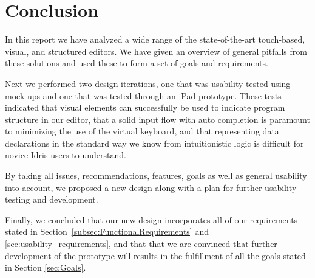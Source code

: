 \chapter{Conclusion}
\label{sec:Conclusion}

In this report we have analyzed a wide range of the state-of-the-art touch-based, visual, and structured
editors. We have given an overview of general pitfalls from these solutions and used these to form a set of goals and requirements. 

Next we performed two design iterations, one that was usability tested using
mock-ups and one that was tested through an iPad prototype. These tests
indicated that visual elements can successfully be used to indicate program structure in our editor, that
a solid input flow with auto completion is paramount to minimizing the use of
the virtual keyboard, and that representing data declarations in the standard
way we know from intuitionistic logic is difficult for novice Idris users to
understand.

By taking all issues, recommendations, features, goals as well as general usability into account, we proposed a new design along with a plan for further usability testing and development.

Finally, we concluded that our new design incorporates all of our requirements stated in
Section~\ref{subsec:FunctionalRequirements} and
\ref{sec:usability_requirements}, and that that we are convinced that further development
of the prototype will results in the fulfillment of all the goals stated in
Section \ref{sec:Goals}.